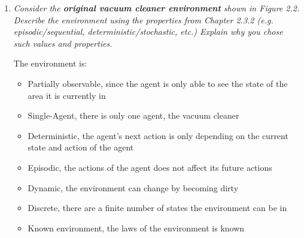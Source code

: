 \begin{enumerate}
\begin{itemize}
            \[
            \begin{tabular}{|c|c|}
                \hline
                \text{Percept sequence} & \text{Action} \\
                \hline
                [A, ADirty, BClean] & Suck \\
                
                [A, AClean, BClean] & Stay \\
                
                [A, AClean, BDirty] & Right \\
                
                [B, ADirty, BDirty] & Suck \\
                
                [B, ADirty, BClean] & Left \\
                \vdots & \\
                \hline
            \end{tabular}
            \]
        \end{itemize}

    \item \textit{Consider the \textbf{original vacuum cleaner environment} shown in Figure 2.2. Describe the environment using the properties from Chapter 2.3.2 (e.g. episodic/sequential, deterministic/stochastic, etc.) Explain why you chose such values and properties.}

    The environment is: 
    \begin{itemize}
        \item Partially observable, since the agent is only able to see the state of the area it is currently in 
        \item Single-Agent, there is only one agent, the vacuum cleaner 
        \item Deterministic, the agent's next action is only depending on the current state and action of the agent 
        \item Episodic, the actions of the agent does not affect its future actions 
        \item Dynamic, the environment can change by becoming dirty 
        \item Discrete, there are a finite number of states the environment can be in 
        \item Known environment, the laws of the environment is known
    \end{itemize}


\end{enumerate}
